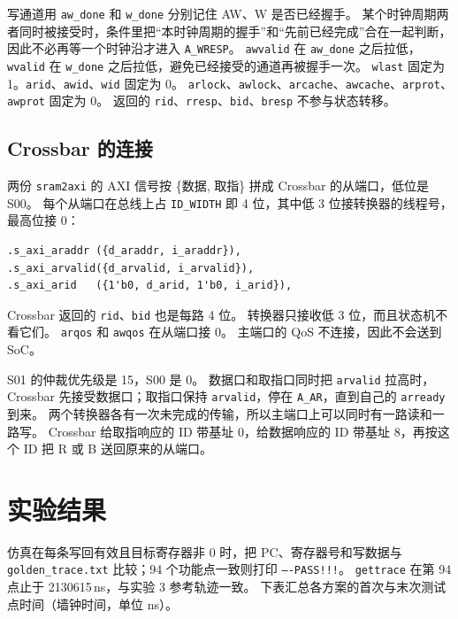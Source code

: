 \documentclass{article}
\begin{document}
写通道用 \texttt{aw\_done} 和 \texttt{w\_done} 分别记住 AW、W 是否已经握手。
某个时钟周期两者同时被接受时，条件里把“本时钟周期的握手”和“先前已经完成”合在一起判断，因此不必再等一个时钟沿才进入 \texttt{A\_WRESP}。
\texttt{awvalid} 在 \texttt{aw\_done} 之后拉低，\texttt{wvalid} 在 \texttt{w\_done} 之后拉低，避免已经接受的通道再被握手一次。
\texttt{wlast} 固定为 1。\texttt{arid}、\texttt{awid}、\texttt{wid} 固定为 0。
\texttt{arlock}、\texttt{awlock}、\texttt{arcache}、\texttt{awcache}、\texttt{arprot}、\texttt{awprot} 固定为 0。
返回的 \texttt{rid}、\texttt{rresp}、\texttt{bid}、\texttt{bresp} 不参与状态转移。

\subsection{Crossbar 的连接}
两份 \texttt{sram2axi} 的 AXI 信号按 \{数据, 取指\} 拼成 Crossbar 的从端口，低位是 S00。
每个从端口在总线上占 \texttt{ID\_WIDTH} 即 4 位，其中低 3 位接转换器的线程号，最高位接 0：
\begin{verbatim}
.s_axi_araddr ({d_araddr, i_araddr}),
.s_axi_arvalid({d_arvalid, i_arvalid}),
.s_axi_arid   ({1'b0, d_arid, 1'b0, i_arid}),
\end{verbatim}
Crossbar 返回的 \texttt{rid}、\texttt{bid} 也是每路 4 位。
转换器只接收低 3 位，而且状态机不看它们。
\texttt{arqos} 和 \texttt{awqos} 在从端口接 0。
主端口的 QoS 不连接，因此不会送到 SoC。

S01 的仲裁优先级是 15，S00 是 0。
数据口和取指口同时把 \texttt{arvalid} 拉高时，Crossbar 先接受数据口；取指口保持 \texttt{arvalid}，停在 \texttt{A\_AR}，直到自己的 \texttt{arready} 到来。
两个转换器各有一次未完成的传输，所以主端口上可以同时有一路读和一路写。
Crossbar 给取指响应的 ID 带基址 0，给数据响应的 ID 带基址 8，再按这个 ID 把 R 或 B 送回原来的从端口。

\section{实验结果}
仿真在每条写回有效且目标寄存器非 0 时，把 PC、寄存器号和写数据与 \texttt{golden\_trace.txt} 比较；94 个功能点一致则打印 \texttt{----PASS!!!}。
\texttt{gettrace} 在第 94 点止于 2130615\,ns，与实验 3 参考轨迹一致。
下表汇总各方案的首次与末次测试点时间（墙钟时间，单位 ns）。
\end{document}
